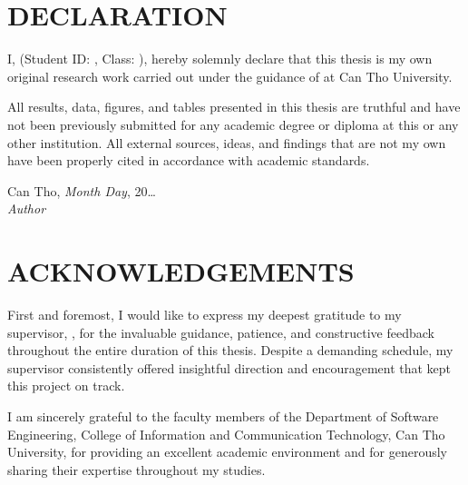 
\newpage
\chapter*{DECLARATION}

I, \textbf{\StudentName} (Student ID: \textbf{\StudentID}, Class: \textbf{\ClassCode}), hereby solemnly declare that this thesis is my own original research work carried out under the guidance of \textbf{\SupervisorTitle{} \SupervisorName} at Can Tho University.

All results, data, figures, and tables presented in this thesis are truthful and have not been previously submitted for any academic degree or diploma at this or any other institution. All external sources, ideas, and findings that are not my own have been properly cited in accordance with academic standards.

\vspace{1.5cm}
\begin{flushright}
    Can Tho, \textit{Month Day}, 20\ldots\\[8pt]
    \textit{Author}\\[2.5cm]
    \textbf{\StudentName}
\end{flushright}

\newpage
\chapter*{ACKNOWLEDGEMENTS}

First and foremost, I would like to express my deepest gratitude to my supervisor, \textbf{\SupervisorTitle{} \SupervisorName}, for the invaluable guidance, patience, and constructive feedback throughout the entire duration of this thesis. Despite a demanding schedule, my supervisor consistently offered insightful direction and encouragement that kept this project on track.

I am sincerely grateful to the faculty members of the Department of Software Engineering, College of Information and Communication Technology, Can Tho University, for providing an excellent academic environment and for generously sharing their expertise throughout my studies.

